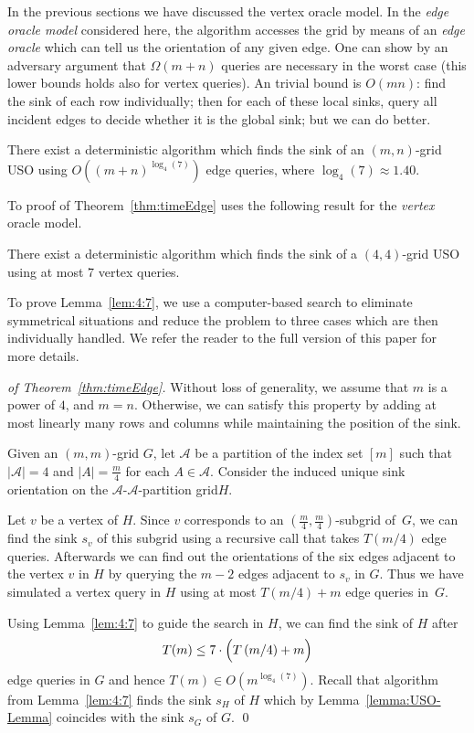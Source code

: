 \documentclass[runningheads,a4paper]{llncs}
\newcommand{\A}{\ensuremath{\mathcal A}}
\newcommand{\aapart}{$\A$-$\A$-partition grid\xspace}
\begin{document}
In the previous sections we have discussed the vertex oracle model.
In the \emph{edge oracle model} considered here, the algorithm accesses the
grid by means of an \emph{edge oracle} which can tell us
the orientation of any given edge.
One can show by an adversary argument that $\Omega(m+n)$ queries are necessary in the worst case (this lower bounds holds also for vertex queries).
An trivial bound is $O(mn)$: find the sink of each row individually; then
for each of these local sinks, query all incident edges to decide whether it
is the global sink;
but we can do better.

\begin{theorem}
    \label{thm:timeEdge}
    There exist a deterministic algorithm which finds the sink of an $(m,n)$-grid USO using $O((m+n) ^ {\log_4(7)})$ edge queries, where $\log_4(7) \approx
    1.40$.
\end{theorem}

To proof of Theorem~\ref{thm:timeEdge} uses the following result for the \emph{vertex} oracle model.

\begin{lemma}
    \label{lem:4:7}
    There exist a deterministic algorithm which finds the sink of a\linebreak
    $(4,4)$-grid USO using at most 7 vertex queries.
\end{lemma}
To prove Lemma~\ref{lem:4:7}, we use a computer-based search to eliminate symmetrical situations and reduce the problem to three cases which are then individually handled.
We refer the reader to the full version of this paper for more details.

\begin{proof}[of Theorem~\ref{thm:timeEdge}]
    Without loss of generality, we assume that $m$ is a power of $4$, and
    $m=n$. Otherwise, we can satisfy this property by adding at most linearly many rows and columns while maintaining the position of the sink.

    Given an $(m,m)$-grid $G$, let $\A$
    be a partition of the index set $[m]$ such that
    $|\A| = 4$ and $|A| = \frac{m}{4}$ for each $A \in \A$.
    Consider the induced unique sink orientation on the \aapart $H$.
    
    
    Let $v$ be a vertex of $H$. Since $v$ corresponds to an $(\frac{m}{4},\frac{m}{4})$-subgrid of~$G$, we can find the sink $s_v$ of this subgrid using a recursive call that takes $T(m/4)$ edge queries.
    Afterwards we can find out the orientations of the six edges
    adjacent to the vertex $v$ in $H$ by querying the $m-2$ edges adjacent to $s_v$ in $G$.
    Thus we have simulated a vertex query in $H$ using at most $T(m/4) + m$ edge queries in~$G$.

Using Lemma~\ref{lem:4:7} to guide the search in $H$, we can find the sink of $H$ after
    \[
        T(m) \le 7 \cdot \Bigl( T \left( m/4 \right) + m \Bigr)
    \]
    edge queries in $G$ and hence $T(m) \in O(m ^ {\log_4(7)})$. 
    Recall that algorithm from Lemma~\ref{lem:4:7} finds the sink $s_H$ of $H$ which by Lemma~\ref{lemma:USO-Lemma} coincides with the sink $s_G$ of $G$.
    \qed
\end{proof}



\end{document}
